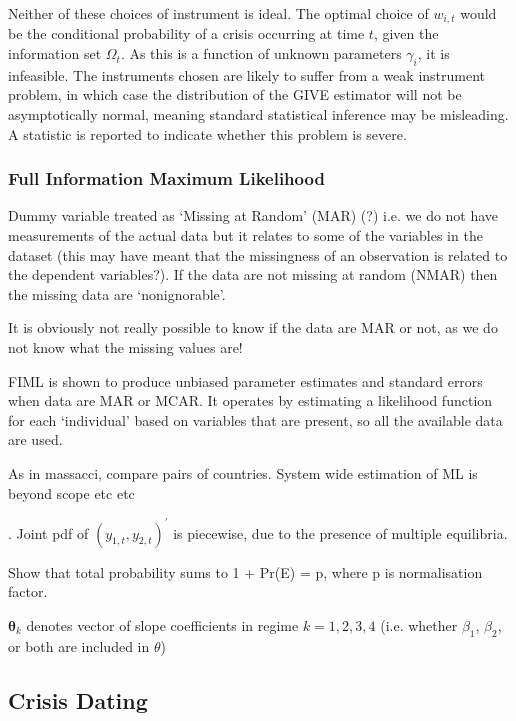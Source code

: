 \documentclass[../base.tex]{subfiles}
\begin{document}
Neither of these choices of instrument is ideal. The optimal choice of $w_{i,t}$ would be the conditional probability of a crisis occurring at time $t$, given the information set $\Omega_t$. As this is a function of unknown parameters $\gamma_i$, it is infeasible. The instruments chosen are likely to suffer from a weak instrument problem, in which case the distribution of the GIVE estimator will not be asymptotically normal, meaning standard statistical inference may be misleading. A \cite{cragg1993testing} statistic is reported to indicate whether this problem is severe. 

\subsubsection{Full Information Maximum Likelihood}

Dummy variable treated as `Missing at Random' (MAR) (?) i.e. we do not have measurements of the actual data but it relates to some of the variables in the dataset (this may have meant that the missingness of an observation is related to the dependent variables?). If the data are not missing at random (NMAR) then the missing data are `nonignorable'.

It is obviously not really possible to know if the data are MAR or not, as we do not know what the missing values are! 

FIML is shown to produce unbiased parameter estimates and standard errors when data are MAR or MCAR. It operates by estimating a likelihood function for each `individual' based on variables that are present, so all the available data are used. 

As in massacci, compare pairs of countries. System wide estimation of ML is beyond scope etc etc

\cite{massacci2007identification}. Joint pdf of $(y_{1,t}, y_{2,t})^{\prime}$ is piecewise, due to the presence of multiple equilibria.

Show that total probability sums to 1 + Pr(E) = p, where p is normalisation factor. 

$\mathbf{\theta}_k$ denotes vector of slope coefficients in regime $k = 1, 2, 3, 4$ (i.e. whether $\beta_1$, $\beta_2$, or both are included in $\theta$)


\subsection{Crisis Dating}
\label{dating_methodology}
\end{document}
